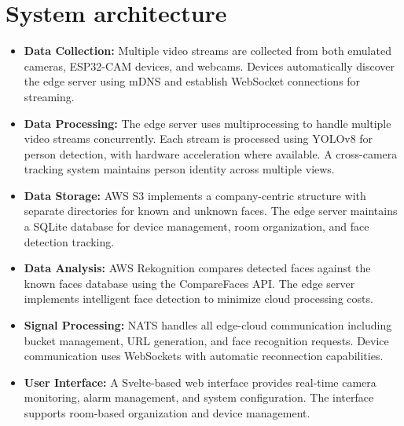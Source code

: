 \documentclass[conference]{IEEEtran}
\begin{document}
\section{System architecture}
\begin{itemize}
      \item \textbf{Data Collection:} Multiple video streams are collected from both emulated cameras, ESP32-CAM devices, and webcams.
            Devices automatically discover the edge server using mDNS and establish WebSocket connections for streaming.          
      \item \textbf{Data Processing:} The edge server uses multiprocessing to handle multiple video streams concurrently.
            Each stream is processed using YOLOv8 for person detection, with hardware acceleration where available.
            A cross-camera tracking system maintains person identity across multiple views.          
      \item \textbf{Data Storage:} AWS S3 implements a company-centric structure with separate directories for known and unknown faces.
            The edge server maintains a SQLite database for device management, room organization, and face detection tracking.        
      \item \textbf{Data Analysis:} AWS Rekognition compares detected faces against the known faces database using the CompareFaces API.
            The edge server implements intelligent face detection to minimize cloud processing costs.       
      \item \textbf{Signal Processing:} NATS handles all edge-cloud communication including bucket management, URL generation,
            and face recognition requests. Device communication uses WebSockets with automatic reconnection capabilities.        
      \item \textbf{User Interface:} A Svelte-based web interface provides real-time camera monitoring, alarm management,
            and system configuration. The interface supports room-based organization and device management.
\end{itemize}
\end{document}
